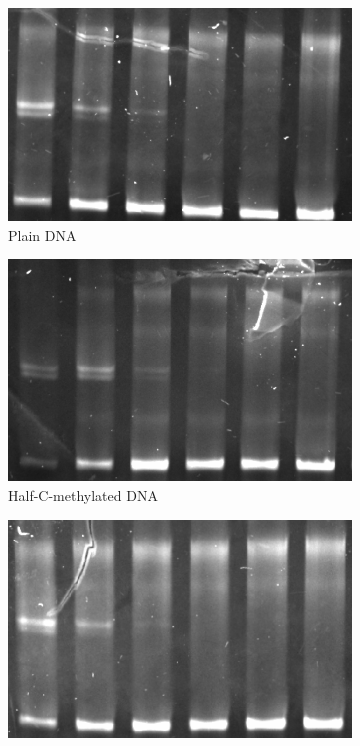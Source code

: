 \documentclass[parskip=full, numbers=noenddot]{scrreprt}
\begin{document}
\begin{figure}[htpb]
  \centering
  \begin{subfigure}[htpb]{0.4\textwidth}
    \centering
    \includegraphics[width=\textwidth]{reconstnuc_a}
    \caption{Plain DNA}
    \label{fig:reconstnuc_a}
  \end{subfigure}
  \begin{subfigure}[htpb]{0.4\textwidth}
    \centering
    \includegraphics[width=\textwidth]{reconstnuc_b}
    \caption{Half-C-methylated DNA}
    \label{fig:reconstnuc_b}
  \end{subfigure}
  \begin{subfigure}[htpb]{0.4\textwidth}
    \centering
    \includegraphics[width=\textwidth]{reconstnuc_c}

\end{subfigure}
\end{figure}
\end{document}
